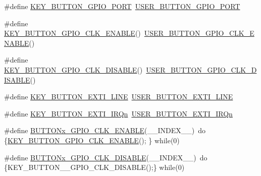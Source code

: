 \begin{DoxyCompactItemize}
\#define \hyperlink{group__B-L072Z-LRWAN1__LOW__LEVEL__BUTTON_ga98680733a6992dacef531bfd0c23031c}{K\+E\+Y\+\_\+\+B\+U\+T\+T\+O\+N\+\_\+\+G\+P\+I\+O\+\_\+\+P\+O\+RT}~\hyperlink{group__B-L072Z-LRWAN1__LOW__LEVEL__BUTTON_gae2e6fc2fdfda22b4eed3667375a8bd81}{U\+S\+E\+R\+\_\+\+B\+U\+T\+T\+O\+N\+\_\+\+G\+P\+I\+O\+\_\+\+P\+O\+RT}
\item 
\#define \hyperlink{group__B-L072Z-LRWAN1__LOW__LEVEL__BUTTON_ga6237d656da42b750f63cbf3e329096d5}{K\+E\+Y\+\_\+\+B\+U\+T\+T\+O\+N\+\_\+\+G\+P\+I\+O\+\_\+\+C\+L\+K\+\_\+\+E\+N\+A\+B\+LE}()~\hyperlink{group__B-L072Z-LRWAN1__LOW__LEVEL__BUTTON_gaa1f35ca26b42710d057661b54ace7d82}{U\+S\+E\+R\+\_\+\+B\+U\+T\+T\+O\+N\+\_\+\+G\+P\+I\+O\+\_\+\+C\+L\+K\+\_\+\+E\+N\+A\+B\+LE}()
\item 
\#define \hyperlink{group__B-L072Z-LRWAN1__LOW__LEVEL__BUTTON_gacf1a6a3b79ec610401d7ffbc1b6115d4}{K\+E\+Y\+\_\+\+B\+U\+T\+T\+O\+N\+\_\+\+G\+P\+I\+O\+\_\+\+C\+L\+K\+\_\+\+D\+I\+S\+A\+B\+LE}()~\hyperlink{group__B-L072Z-LRWAN1__LOW__LEVEL__BUTTON_ga71af1d1eec8f8b424b72f625abaad282}{U\+S\+E\+R\+\_\+\+B\+U\+T\+T\+O\+N\+\_\+\+G\+P\+I\+O\+\_\+\+C\+L\+K\+\_\+\+D\+I\+S\+A\+B\+LE}()
\item 
\#define \hyperlink{group__B-L072Z-LRWAN1__LOW__LEVEL__BUTTON_gae22d60d9f89ae7203bcd5ca8146bcef0}{K\+E\+Y\+\_\+\+B\+U\+T\+T\+O\+N\+\_\+\+E\+X\+T\+I\+\_\+\+L\+I\+NE}~\hyperlink{group__B-L072Z-LRWAN1__LOW__LEVEL__BUTTON_gac41d04c2244ba780e4749991c85d1e9a}{U\+S\+E\+R\+\_\+\+B\+U\+T\+T\+O\+N\+\_\+\+E\+X\+T\+I\+\_\+\+L\+I\+NE}
\item 
\#define \hyperlink{group__B-L072Z-LRWAN1__LOW__LEVEL__BUTTON_gaeb5bffe8281b0754675cfdfb2847e82d}{K\+E\+Y\+\_\+\+B\+U\+T\+T\+O\+N\+\_\+\+E\+X\+T\+I\+\_\+\+I\+R\+Qn}~\hyperlink{group__B-L072Z-LRWAN1__LOW__LEVEL__BUTTON_ga2e6e65a053529869d1c370610825d98f}{U\+S\+E\+R\+\_\+\+B\+U\+T\+T\+O\+N\+\_\+\+E\+X\+T\+I\+\_\+\+I\+R\+Qn}
\item 
\#define \hyperlink{group__B-L072Z-LRWAN1__LOW__LEVEL__BUTTON_gaa397abaece51f4d7aafb07fd79640f3e}{B\+U\+T\+T\+O\+Nx\+\_\+\+G\+P\+I\+O\+\_\+\+C\+L\+K\+\_\+\+E\+N\+A\+B\+LE}(\+\_\+\+\_\+\+I\+N\+D\+E\+X\+\_\+\+\_\+)~do \{\hyperlink{group__B-L072Z-LRWAN1__LOW__LEVEL__BUTTON_ga6237d656da42b750f63cbf3e329096d5}{K\+E\+Y\+\_\+\+B\+U\+T\+T\+O\+N\+\_\+\+G\+P\+I\+O\+\_\+\+C\+L\+K\+\_\+\+E\+N\+A\+B\+LE}();  \} while(0)
\item 
\#define \hyperlink{group__B-L072Z-LRWAN1__LOW__LEVEL__BUTTON_gaf44f31971ce49524d0243b8e37048b8f}{B\+U\+T\+T\+O\+Nx\+\_\+\+G\+P\+I\+O\+\_\+\+C\+L\+K\+\_\+\+D\+I\+S\+A\+B\+LE}(\+\_\+\+\_\+\+I\+N\+D\+E\+X\+\_\+\+\_\+)~do \{K\+E\+Y\+\_\+\+B\+U\+T\+T\+O\+N\+\_\+\+\_\+\+G\+P\+I\+O\+\_\+\+C\+L\+K\+\_\+\+D\+I\+S\+A\+B\+LE();\} while(0)
\end{DoxyCompactItemize}


